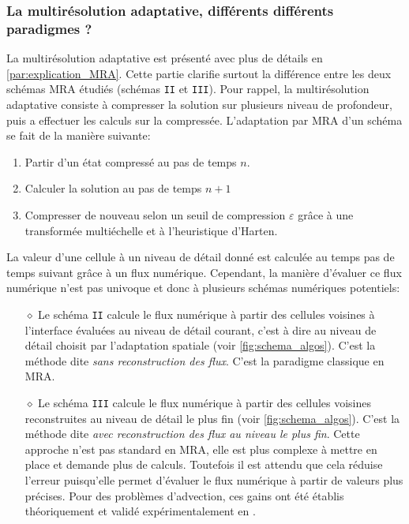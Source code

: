         \subsubsection{La multirésolution adaptative, différents différents paradigmes ?}\label{par:paradigme_MRA}
            La multirésolution adaptative est présenté avec plus de détails en \ref{par:explication_MRA}.    
            Cette partie clarifie surtout la différence entre les deux schémas MRA étudiés (schémas \texttt{II} et \texttt{III}).
            Pour rappel, la multirésolution adaptative consiste à compresser la solution sur plusieurs niveau de profondeur,
            puis a effectuer les calculs sur la compressée.
            L'adaptation par MRA d'un schéma se fait de la manière suivante:
            \begin{enumerate}
                \item Partir d'un état compressé au pas de temps $n$.
                \item Calculer la solution au pas de temps $n+1$
                \item Compresser de nouveau selon un seuil de compression $\varepsilon$ grâce à une transformée multiéchelle et à l'heuristique d'Harten.
            \end{enumerate}
            La valeur d'une cellule à un niveau de détail donné est calculée au temps pas de temps suivant
            grâce à un flux numérique. 
            Cependant, la manière d'évaluer ce flux numérique n'est pas univoque et donc à plusieurs schémas numériques potentiels:
            \begin{itemize}
                \item[$\diamond$] Le schéma \texttt{II} calcule le flux numérique
                à partir des cellules voisines à l’interface évaluées au niveau de détail courant, c'est à dire au niveau de détail choisit par l'adaptation spatiale (voir \ref{fig:schema_algos}). 
                C'est la méthode dite \textit{sans reconstruction des flux}. C'est la paradigme classique en MRA.
                \item[$\diamond$] Le schéma \texttt{III} calcule le flux numérique 
                à partir des cellules voisines reconstruites au niveau de détail le plus fin (voir \ref{fig:schema_algos}). C'est la méthode dite \textit{avec reconstruction des flux au niveau le plus fin}.
                Cette approche n'est pas standard en MRA, elle est plus complexe à mettre en place et demande plus de calculs.
                Toutefois il est attendu que cela réduise l'erreur puisqu'elle permet d'évaluer le flux numérique à partir de valeurs plus précises.
                Pour des problèmes d'advection, ces gains ont été établis théoriquement et validé expérimentalement en \cite{belloti_et_al_2025}.
            \end{itemize}
